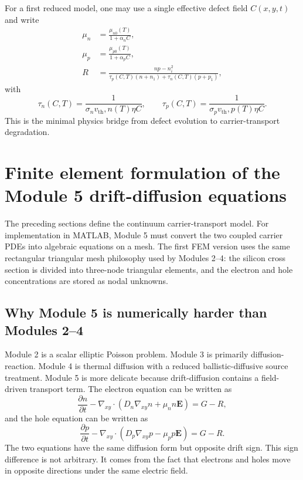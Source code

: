 \documentclass[11pt]{article}
\newcommand{\vt}{v_{\mathrm{th}}}
\begin{document}
For a first reduced model, one may use a single effective defect field \(C(x,y,t)\) and write
\begin{align}
\mu_n&=\frac{\mu_{n0}(T)}{1+\alpha_n C}, \\
\mu_p&=\frac{\mu_{p0}(T)}{1+\alpha_p C}, \\
R&=\frac{np-n_i^2}{\tau_p(C,T)(n+n_1)+\tau_n(C,T)(p+p_1)},
\end{align}
with
\begin{equation}
\tau_n(C,T)=\frac{1}{\sigma_n \vt,n(T) \eta C},
\qquad
\tau_p(C,T)=\frac{1}{\sigma_p \vt,p(T) \eta C}.
\end{equation}
This is the minimal physics bridge from defect evolution to carrier-transport degradation.


\section{Finite element formulation of the Module 5 drift-diffusion equations}

The preceding sections define the continuum carrier-transport model. For implementation in MATLAB, Module 5 must convert the two coupled carrier PDEs into algebraic equations on a mesh. The first FEM version uses the same rectangular triangular mesh philosophy used by Modules 2--4: the silicon cross section is divided into three-node triangular elements, and the electron and hole concentrations are stored as nodal unknowns.

\subsection{Why Module 5 is numerically harder than Modules 2--4}

Module 2 is a scalar elliptic Poisson problem. Module 3 is primarily diffusion-reaction. Module 4 is thermal diffusion with a reduced ballistic-diffusive source treatment. Module 5 is more delicate because drift-diffusion contains a field-driven transport term. The electron equation can be written as
\begin{equation}
    \frac{\partial n}{\partial t}-\nabla_{xy}\cdot\left(D_n\nabla_{xy}n+\mu_n n\mathbf{E}\right)=G-R,
    \label{eq:m5_fem_strong_n}
\end{equation}
and the hole equation can be written as
\begin{equation}
    \frac{\partial p}{\partial t}-\nabla_{xy}\cdot\left(D_p\nabla_{xy}p-\mu_p p\mathbf{E}\right)=G-R.
    \label{eq:m5_fem_strong_p}
\end{equation}
The two equations have the same diffusion form but opposite drift sign. This sign difference is not arbitrary. It comes from the fact that electrons and holes move in opposite directions under the same electric field.
\end{document}
